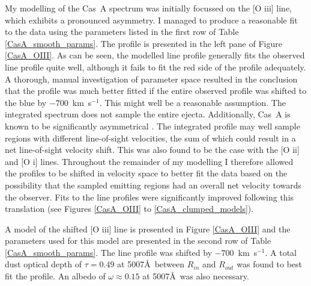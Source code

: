 My modelling of the Cas~A spectrum was initially focussed on the [O {\sc iii}] line, which exhibits a pronounced asymmetry.  I managed to produce a reasonable fit to the data using the parameters listed in the first row of Table \ref{CasA_smooth_params}.  The profile is presented in the left pane of Figure \ref{CasA_OIII}.  As can be seen,  the modelled line profile generally fits the observed line profile quite well, although it fails to fit the red side of the profile adequately.  A thorough, manual investigation of parameter space resulted in the conclusion that the profile was much better fitted if the entire observed profile was shifted to the blue by $-700$~km~s$^{-1}$.  This might well be a reasonable assumption.  The integrated spectrum does not sample the entire ejecta.  Additionally, Cas~A is known to be significantly asymmetrical \citep{Rest2011}.  The integrated profile may well sample regions with different line-of-sight velocities, the sum of which could result in a net line-of-sight velocity shift.  This was also found to be the case with the [O {\sc ii}] and [O {\sc i}] lines.  Throughout the remainder of my modelling I therefore allowed the profiles to be shifted in velocity space to better fit the data based on the possibility that the sampled emitting regions had an overall net velocity towards the observer.  Fits to the line profiles were significantly improved following this translation (see Figures \ref{CasA_OIII} to \ref{CasA_clumped_models}).

A model of the shifted [O {\sc iii}] line is presented in Figure \ref{CasA_OIII} and the parameters used for this model are presented in the second row of Table \ref{CasA_smooth_params}.  The line profile was shifted by $-700$~km~s$^{-1}$.  A total dust optical depth of $\tau=0.49$ at 5007\AA\ between $R_{in}$ and $R_{out}$ was found to best fit the profile.  An albedo of $\omega\approx0.15$ at 5007\AA\ was also necessary.

